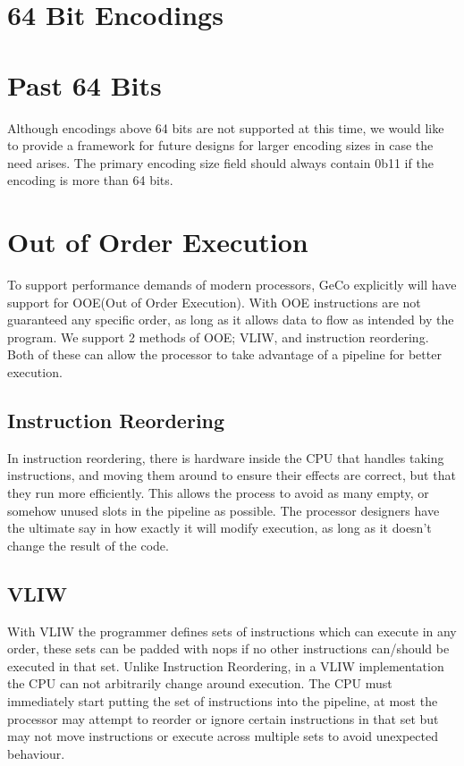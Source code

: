 \documentclass[6pt]{article}
\begin{document}
\section{64 Bit Encodings}

\section{Past 64 Bits}
Although encodings above 64 bits are not supported at this time, we would like to provide a framework for future designs for larger encoding sizes in case the need arises. The primary encoding size field should always contain 0b11 if the encoding is more than 64 bits.

\section{Out of Order Execution}
To support performance demands of modern processors, GeCo explicitly will have support for OOE(Out of Order Execution). With OOE instructions are not guaranteed any specific order, as long as it allows data to flow as intended by the program. We support 2 methods of OOE; VLIW, and instruction reordering. 
Both of these can allow the processor to take advantage of a pipeline for better execution.

\subsection{Instruction Reordering}
In instruction reordering, there is hardware inside the CPU that handles taking instructions, and moving them around to ensure their effects are correct, but that they run more efficiently.
This allows the process to avoid as many empty, or somehow unused slots in the pipeline as possible. 
The processor designers have the ultimate say in how exactly it will modify execution, as long as it doesn't change the result of the code.

\subsection{VLIW}
With VLIW the programmer defines sets of instructions which can execute in any order, these sets can be padded with nops if no other instructions can/should be executed in that set.
Unlike Instruction Reordering, in a VLIW implementation the CPU can not arbitrarily change around execution. 
The CPU must immediately start putting the set of instructions into the pipeline, at most the processor may attempt to reorder or ignore certain instructions in that set but may not move instructions or execute across multiple sets to avoid unexpected behaviour.
\end{document}

